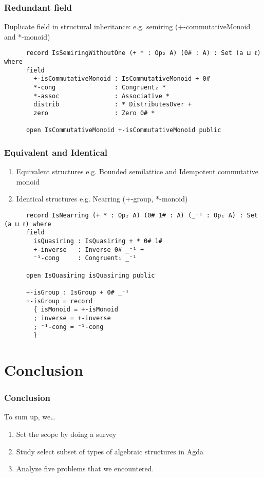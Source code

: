 \documentclass[xcolor={dvipsnames}]{beamer}
\begin{document}
\begin{frame}[fragile]
  \frametitle{Redundant field}

  Duplicate field in structural inheritance: e.g. semiring (+-commutativeMonoid and *-monoid)

    \begin{verbatim}
      record IsSemiringWithoutOne (+ * : Op₂ A) (0# : A) : Set (a ⊔ ℓ) where
      field
        +-isCommutativeMonoid : IsCommutativeMonoid + 0#
        *-cong                : Congruent₂ *
        *-assoc               : Associative *
        distrib               : * DistributesOver +
        zero                  : Zero 0# *
      
      open IsCommutativeMonoid +-isCommutativeMonoid public
    \end{verbatim}
\end{frame}

\begin{frame}[fragile]
  \frametitle{Equivalent and Identical}
  \begin{enumerate} 
    \item Equivalent structures e.g. Bounded semilattice and Idempotent commutative monoid
    \item Identical structures e.g. Nearring (+-group, *-monoid)
  \end{enumerate}

    \begin{verbatim}
      record IsNearring (+ * : Op₂ A) (0# 1# : A) (_⁻¹ : Op₁ A) : Set (a ⊔ ℓ) where
      field
        isQuasiring : IsQuasiring + * 0# 1#
        +-inverse   : Inverse 0# _⁻¹ +
        ⁻¹-cong     : Congruent₁ _⁻¹
      
      open IsQuasiring isQuasiring public

      +-isGroup : IsGroup + 0# _⁻¹
      +-isGroup = record 
        { isMonoid = +-isMonoid 
        ; inverse = +-inverse 
        ; ⁻¹-cong = ⁻¹-cong 
        }
    \end{verbatim}
\end{frame}

\section{Conclusion}

\begin{frame}
  \frametitle{Conclusion}

  To sum up, we\ldots{}
  \begin{enumerate}
    \item Set the scope by doing a survey 
    \item Study select subset of types of algebraic structures in Agda
    \item Analyze five problems that we encountered.
  \end{enumerate}
\end{frame}
\end{document}
